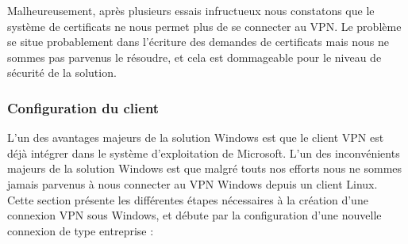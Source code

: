 Malheureusement, après plusieurs essais infructueux nous constatons que le système de certificats ne nous permet plus de se connecter au VPN. Le problème se situe probablement dans l'écriture des demandes de certificats mais nous ne sommes pas parvenus le résoudre, et cela est dommageable pour le niveau de sécurité de la solution.

\subsubsection{Configuration du client}
\label{label_client_windows}

L'un des avantages majeurs de la solution Windows est que le client VPN est déjà intégrer dans le système d'exploitation de Microsoft. L'un des inconvénients majeurs de la solution Windows est que malgré touts nos efforts nous ne sommes jamais parvenus à nous connecter au VPN Windows depuis un client Linux. Cette section présente les différentes étapes nécessaires à la création d'une connexion VPN sous Windows, et débute par la configuration d'une nouvelle connexion de type entreprise :


